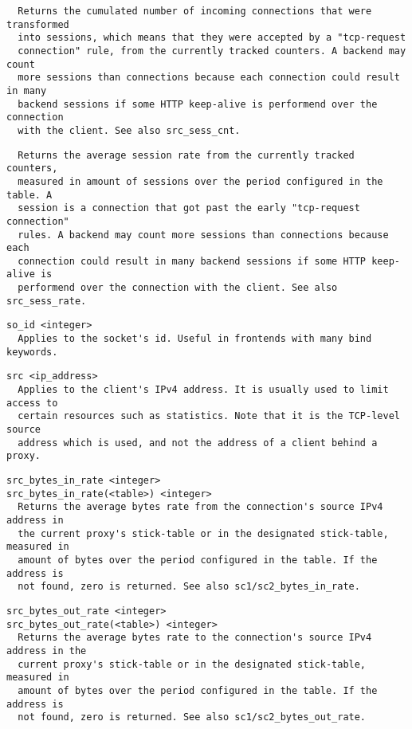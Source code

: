 \begin{verbatim}
  Returns the cumulated number of incoming connections that were transformed
  into sessions, which means that they were accepted by a "tcp-request
  connection" rule, from the currently tracked counters. A backend may count
  more sessions than connections because each connection could result in many
  backend sessions if some HTTP keep-alive is performend over the connection
  with the client. See also src_sess_cnt.
\end{verbatim}

\begin{verbatim}
  Returns the average session rate from the currently tracked counters,
  measured in amount of sessions over the period configured in the table. A
  session is a connection that got past the early "tcp-request connection"
  rules. A backend may count more sessions than connections because each
  connection could result in many backend sessions if some HTTP keep-alive is
  performend over the connection with the client. See also src_sess_rate.
\end{verbatim}

\begin{verbatim}
so_id <integer>
  Applies to the socket's id. Useful in frontends with many bind keywords.
\end{verbatim}

\begin{verbatim}
src <ip_address>
  Applies to the client's IPv4 address. It is usually used to limit access to
  certain resources such as statistics. Note that it is the TCP-level source
  address which is used, and not the address of a client behind a proxy.
\end{verbatim}

\begin{verbatim}
src_bytes_in_rate <integer>
src_bytes_in_rate(<table>) <integer>
  Returns the average bytes rate from the connection's source IPv4 address in
  the current proxy's stick-table or in the designated stick-table, measured in
  amount of bytes over the period configured in the table. If the address is
  not found, zero is returned. See also sc1/sc2_bytes_in_rate.
\end{verbatim}

\begin{verbatim}
src_bytes_out_rate <integer>
src_bytes_out_rate(<table>) <integer>
  Returns the average bytes rate to the connection's source IPv4 address in the
  current proxy's stick-table or in the designated stick-table, measured in
  amount of bytes over the period configured in the table. If the address is
  not found, zero is returned. See also sc1/sc2_bytes_out_rate.
\end{verbatim}

